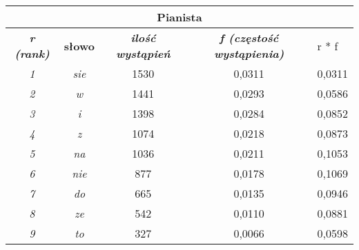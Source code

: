 \documentclass[a4paper]{article}
\begin{document}
\begin{table}
\begin{tabular}{ccc|c|l|}
\hline
\multicolumn{5}{|c|}{\textbf{Pianista}}                                                                                                                                          \\ \hline
\multicolumn{1}{|c|}{\textit{\textbf{r (rank)}}} & \multicolumn{1}{c|}{\textbf{słowo}} & \textit{\textbf{ilość wystąpień}} & \textit{\textbf{f (częstość wystąpienia)}} & r * f  \\ \hline
\multicolumn{1}{|c|}{\textit{1}}                 & \multicolumn{1}{c|}{\textit{sie}}   & 1530                              & 0,0311                                     & 0,0311 \\ \hline
\multicolumn{1}{|c|}{\textit{2}}                 & \multicolumn{1}{c|}{\textit{w}}     & 1441                              & 0,0293                                     & 0,0586 \\ \hline
\multicolumn{1}{|c|}{\textit{3}}                 & \multicolumn{1}{c|}{\textit{i}}     & 1398                              & 0,0284                                     & 0,0852 \\ \hline
\multicolumn{1}{|c|}{\textit{4}}                 & \multicolumn{1}{c|}{\textit{z}}     & 1074                              & 0,0218                                     & 0,0873 \\ \hline
\multicolumn{1}{|c|}{\textit{5}}                 & \multicolumn{1}{c|}{\textit{na}}    & 1036                              & 0,0211                                     & 0,1053 \\ \hline
\multicolumn{1}{|c|}{\textit{6}}                 & \multicolumn{1}{c|}{\textit{nie}}   & 877                               & 0,0178                                     & 0,1069 \\ \hline
\multicolumn{1}{|c|}{\textit{7}}                 & \multicolumn{1}{c|}{\textit{do}}    & 665                               & 0,0135                                     & 0,0946 \\ \hline
\multicolumn{1}{|c|}{\textit{8}}                 & \multicolumn{1}{c|}{\textit{ze}}    & 542                               & 0,0110                                     & 0,0881 \\ \hline
\multicolumn{1}{|c|}{\textit{9}}                 & \multicolumn{1}{c|}{\textit{to}}    & 327                               & 0,0066                                     & 0,0598 \\ \hline

\end{tabular}
\end{table}
\end{document}
